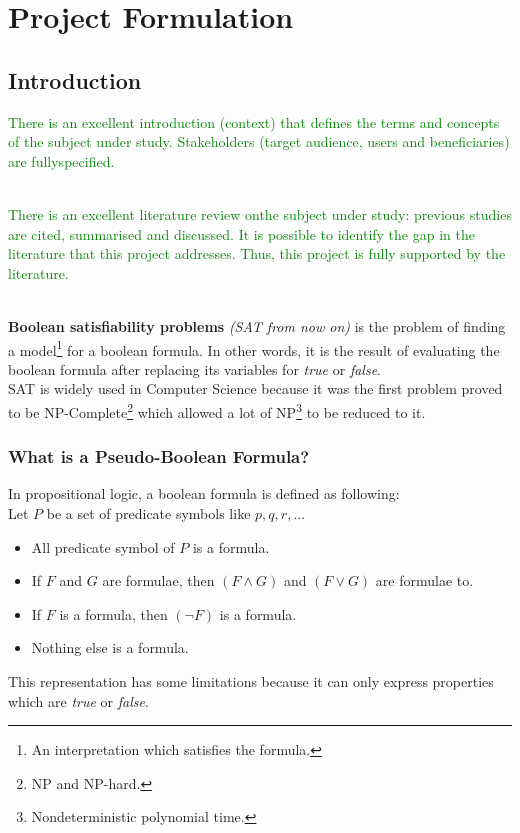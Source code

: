 
\chapter{Project Formulation} %

\label{Chapter1} %

\section{Introduction}
\textcolor{green}{
	There is an excellent introduction
	(context) that defines the terms
	and concepts of the subject under
	study. Stakeholders (target
	audience, users and beneficiaries)
	are fullyspecified.
	\\
	\\}

\textcolor{green}{There is an excellent literature
	review onthe subject under study:
	previous studies are cited,
	summarised and discussed.
	It is possible to identify the gap in
	the literature that this project
	addresses. Thus, this project is
	fully supported by the literature.
	\\
	\\}


\textbf{Boolean satisfiability problems} \textit{(SAT from now on)} is the problem of finding a model\footnote{An interpretation which satisfies the formula.} for a boolean formula. In other words, it is the result of evaluating the boolean formula after replacing its variables for \emph{true} or \emph{false}. 
\\
SAT is widely used in Computer Science because it was the first problem proved to be NP-Complete\cite{Cook1971}\footnote{NP and NP-hard.} which allowed a lot of NP\footnote{Nondeterministic polynomial time.} to be reduced to it.

\subsection{What is a Pseudo-Boolean Formula?}
In propositional logic, a boolean formula is defined as following\cite{Lpo}:\\
Let $P$ be a set of predicate symbols like $p,q,r,...$
\begin{itemize}
	\item All predicate symbol of $P$ is a formula.
	\item If $F$ and $G$ are formulae, then $(F \land G)$ and $(F \lor G)$ are formulae to.
	\item If $F$ is a formula, then $(\neg F)$ is a formula.
	\item Nothing else is a formula.
\end{itemize}
This representation has some limitations because it can only express properties which are \emph{true} or \emph{false}.\\


